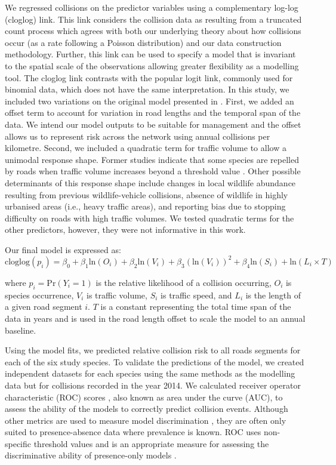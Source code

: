 We regressed collisions on the predictor variables using a complementary log-log (cloglog) link.  This link considers the collision data as resulting from a truncated count process which agrees with both our underlying theory about how collisions occur (as a rate following a Poisson distribution) and our data construction methodology. Further, this link can be used to specify a model that is invariant to the spatial scale of the observations allowing greater flexibility as a modelling tool. The cloglog link contrasts with the popular logit link, commonly used for binomial data, which does not have the same interpretation. In this study, we included two variations on the original model presented in . First, we added an offset term to account for variation in road lengths and the temporal span of the data. We intend our model outputs to be suitable for management and the offset allows us to represent risk across the network using annual collisions per kilometre. Second, we included a quadratic term for traffic volume to allow a unimodal response shape. Former studies indicate that some species are repelled by roads when traffic volume increases beyond a threshold value \citep{seil05,gagn07}. Other possible determinants of this response shape include changes in local wildlife abundance resulting from previous wildlife-vehicle collisions, absence of wildlife in highly urbanised areas (i.e., heavy traffic areas), and reporting bias due to stopping difficulty on roads with high traffic volumes. We tested quadratic terms for the other predictors, however, they were not informative in this work.

Our final model is expressed as: 
\begin{equation}
\text{cloglog}(p_i) = \beta_0 + \beta_1 \text{ln}(O_i) + \beta_2 \text{ln}(V_i) + \beta_3 (\text{ln}(V_i))^2 + \beta_4 \text{ln}(S_i) + \text{ln}(L_i \times T)
\end{equation}

\noindent where $p_i=\text{Pr}(Y_i=1)$ is the relative likelihood of a collision occurring, $O_i$ is species occurrence, $V_i$ is traffic volume, $S_i$ is traffic speed, and $L_i$ is the length of a given road segment $i$. $T$ is a constant representing the total time span of the data in years and is used in the road length offset to scale the model to an annual baseline.

Using the model fits, we predicted relative collision risk to all roads segments for each of the six study species.  To validate the predictions of the model, we created independent datasets for each species using the same methods as the modelling data but for collisions recorded in the year 2014.  We calculated receiver operator characteristic (ROC) scores \citep{metz78}, also known as area under the curve (AUC), to assess the ability of the models to correctly predict collision events. Although other metrics are used to measure model discrimination \citep[e.g. true skill statistic (TSS), see][]{allo06}, they are often only suited to presence-absence data where prevalence is known. ROC uses non-specific threshold values and is an appropriate measure for assessing the discriminative ability of presence-only models \citep{laws14}. 

